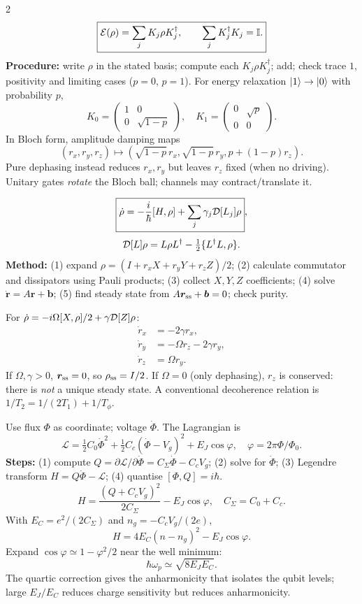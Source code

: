 \begin{multicols}{2}\small
{}
\[\boxed{\mathcal E(\rho)=\sum_jK_j\rho K_j^\dagger,\qquad\sum_jK_j^\dagger K_j=\mathbb I.}\]
\textbf{Procedure:} write $\rho$ in the stated basis; compute each $K_j\rho K_j^\dagger$; add; check trace $1$, positivity and limiting cases ($p=0$, $p=1$). For energy relaxation $\left\lvert 1\right\rangle\to\left\lvert 0\right\rangle$ with probability $p$,
\[K_0=\begin{pmatrix}1&0\\0&\sqrt{1-p}\end{pmatrix},\quad
K_1=\begin{pmatrix}0&\sqrt p\\0&0\end{pmatrix}.\]
In Bloch form, amplitude damping maps
\[\boxed{(r_x,r_y,r_z)\mapsto(\sqrt{1-p}\,r_x,\sqrt{1-p}\,r_y,p+(1-p)r_z).}\]
Pure dephasing instead reduces $r_x,r_y$ but leaves $r_z$ fixed (when no driving). Unitary gates \emph{rotate} the Bloch ball; channels may contract/translate it.

\[\boxed{\dot\rho=-\frac{i}{\hbar}[H,\rho]+\sum_j\gamma_j\mathcal D[L_j]\rho},\]
\[\mathcal D[L]\rho=L\rho L^\dagger-\tfrac12\{L^\dagger L,\rho\}.\]
\textbf{Method:} (1) expand $\rho=(I+r_xX+r_yY+r_zZ)/2$; (2) calculate commutator and dissipators using Pauli products; (3) collect $X,Y,Z$ coefficients; (4) solve $\dot{\bm r}=A\bm r+\bm b$; (5) find steady state from $A\bm r_{\rm ss}+\bm b=0$; check purity.

For $\dot\rho=-i\Omega[X,\rho]/2+\gamma\mathcal D[Z]\rho$:
\[\boxed{\begin{aligned}
\dot r_x&=-2\gamma r_x,\\
\dot r_y&=-\Omega r_z-2\gamma r_y,\\
\dot r_z&=\Omega r_y.
\end{aligned}}\]
If $\Omega,\gamma>0$, $\bm r_{\rm ss}=0$, so $\rho_{\rm ss}=I/2$. If $\Omega=0$ (only dephasing), $r_z$ is conserved: there is \emph{not} a unique steady state. A conventional decoherence relation is $1/T_2=1/(2T_1)+1/T_\phi$.

Use flux $\Phi$ as coordinate; voltage $\dot\Phi$. The Lagrangian is
\[\mathcal L=\tfrac12C_0\dot\Phi^2+\tfrac12C_c(\dot\Phi-V_g)^2+E_J\cos\varphi,\quad\varphi=2\pi\Phi/\Phi_0.\]
\textbf{Steps:} (1) compute $Q=\partial\mathcal L/\partial\dot\Phi=C_\Sigma\dot\Phi-C_cV_g$; (2) solve for $\dot\Phi$; (3) Legendre transform $H=Q\dot\Phi-\mathcal L$; (4) quantise $[\Phi,Q]=i\hbar$.
\[\boxed{H=\frac{(Q+C_cV_g)^2}{2C_\Sigma}-E_J\cos\varphi,\quad C_\Sigma=C_0+C_c.}\]
With $E_C=e^2/(2C_\Sigma)$ and $n_g=-C_cV_g/(2e)$,
\[H=4E_C(n-n_g)^2-E_J\cos\varphi.\]
Expand $\cos\varphi\simeq1-\varphi^2/2$ near the well minimum:
\[\boxed{\hbar\omega_p\simeq\sqrt{8E_JE_C}.}\]
The quartic correction gives the anharmonicity that isolates the qubit levels; large $E_J/E_C$ reduces charge sensitivity but reduces anharmonicity.


\end{multicols}
